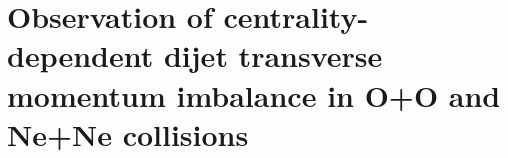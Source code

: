 \section{Observation of centrality-dependent dijet transverse momentum imbalance in O+O and Ne+Ne collisions}
\label{ch:xj}






